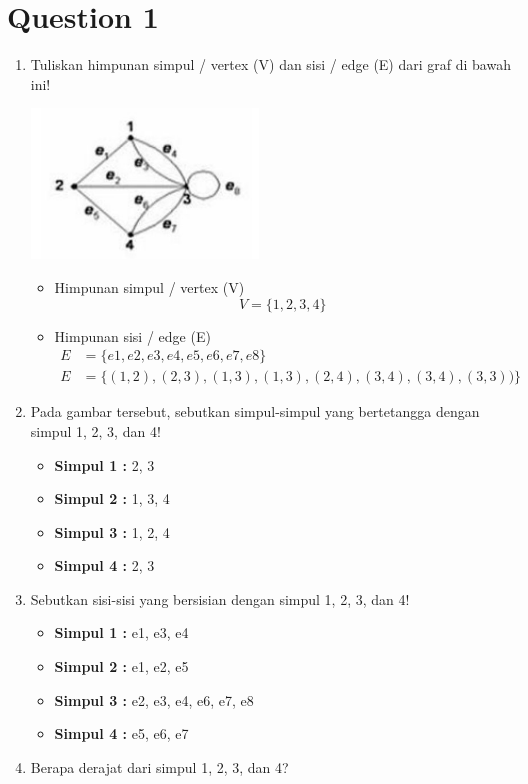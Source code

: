\documentclass[12pt,titlepage]{article}
\begin{document}
\section{Question 1}
\begin{enumerate}[label=\alph*.)]
    \item {
        Tuliskan himpunan simpul / vertex (V) dan sisi / edge (E) dari graf di bawah ini!
        \begin{center}
            \includegraphics*[height=4cm]{./images/graph-1.png}
        \end{center}

        \begin{itemize}
            \item {
                Himpunan simpul / vertex (V)
                \begin{equation*}
                    V = \{1, 2, 3, 4\}
                \end{equation*}
            }
            \item {
                Himpunan sisi / edge (E)
                \begin{align*}
                    E &= \{e1, e2, e3, e4, e5, e6, e7, e8\}\\
                    E &= \{(1,2), (2,3), (1,3), (1,3), (2,4), (3,4), (3,4), (3,3))\}
                \end{align*}
            }
        \end{itemize}
    }
    \item {
        Pada gambar tersebut, sebutkan simpul-simpul yang bertetangga dengan simpul 1, 2, 3, dan 4!
        \begin{itemize}
            \item \textbf{Simpul 1 :} 2, 3
            \item \textbf{Simpul 2 :} 1, 3, 4
            \item \textbf{Simpul 3 :} 1, 2, 4
            \item \textbf{Simpul 4 :} 2, 3
        \end{itemize}
    }
    \item {
        Sebutkan sisi-sisi yang bersisian dengan simpul 1, 2, 3, dan 4!
        \begin{itemize}
            \item \textbf{Simpul 1 :} e1, e3, e4
            \item \textbf{Simpul 2 :} e1, e2, e5
            \item \textbf{Simpul 3 :} e2, e3, e4, e6, e7, e8
            \item \textbf{Simpul 4 :} e5, e6, e7
        \end{itemize}
    }
    \item {
        Berapa derajat dari simpul 1, 2, 3, dan 4?

}
\end{enumerate}
\end{document}
